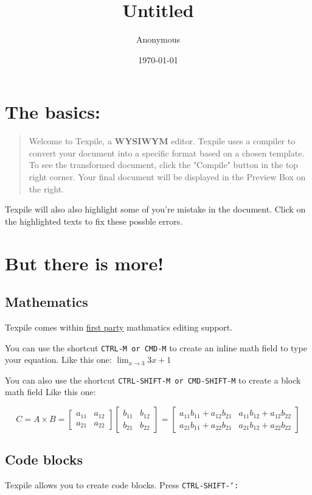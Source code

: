 \documentclass{article}
\title{Untitled}\author{Anonymous}\date{\today}
\begin{document}
\section*{The basics:}\begin{quote}

Welcome to Texpile, a \textbf{WYSIWYM}  editor. Texpile uses a compiler to convert your document into a specific format based on a chosen template. To see the transformed document, click the "Compile" button in the top right corner. Your final document will be displayed in the Preview Box on the right.

\end{quote}


Texpile will also also highlight some of you're mistake in the document. Click on the highlighted texts to fix these possble errors.


\section*{But there is more!}\subsection*{Mathematics}
Texpile comes within \ul{first party} mathmatics editing support.

You can use the shortcut \texttt{CTRL-M or CMD-M} to create an inline math field to type your equation. Like this one: $\lim_{x\to3}3x+1$

You can also use the shortcut \texttt{CTRL-SHIFT-M or CMD-SHIFT-M} to create a block math field Like this one:


\begin{equation}
C = A \times B = \begin{bmatrix}
a_{11} & a_{12} \\
a_{21} & a_{22}
\end{bmatrix}
\begin{bmatrix}
b_{11} & b_{12} \\
b_{21} & b_{22}
\end{bmatrix}
= \begin{bmatrix}
a_{11}b_{11} + a_{12}b_{21} & a_{11}b_{12} + a_{12}b_{22} \\
a_{21}b_{11} + a_{22}b_{21} & a_{21}b_{12} + a_{22}b_{22}
\end{bmatrix}
\end{equation}\subsection*{Code blocks}
Texpile allows you to create code blocks. Press \texttt{CTRL-SHIFT-`:}
\end{document}
